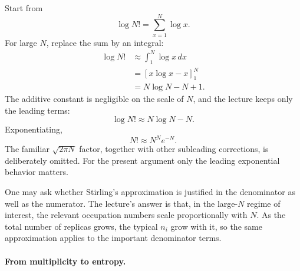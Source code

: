 Start from
\begin{equation}
\log N! = \sum_{x=1}^{N}\log x.
\end{equation}
For large \(N\), replace the sum by an integral:
\begin{align}
\log N! &\approx \int_1^N \log x\,dx \\
&= \left[x\log x-x\right]_1^N \\
&= N\log N-N+1.
\end{align}
The additive constant is negligible on the scale of \(N\), and the lecture keeps only the leading terms:
\begin{equation}
\log N!\approx N\log N-N.
\end{equation}
Exponentiating,
\begin{equation}
N!\approx N^N e^{-N}.
\end{equation}
The familiar \(\sqrt{2\pi N}\) factor, together with other subleading corrections, is deliberately omitted. For the present argument only the leading exponential behavior matters.

One may ask whether Stirling's approximation is justified in the denominator as well as the numerator. The lecture's answer is that, in the large-\(N\) regime of interest, the relevant occupation numbers scale proportionally with \(N\). As the total number of replicas grows, the typical \(n_i\) grow with it, so the same approximation applies to the important denominator terms.

\paragraph{From multiplicity to entropy.}


